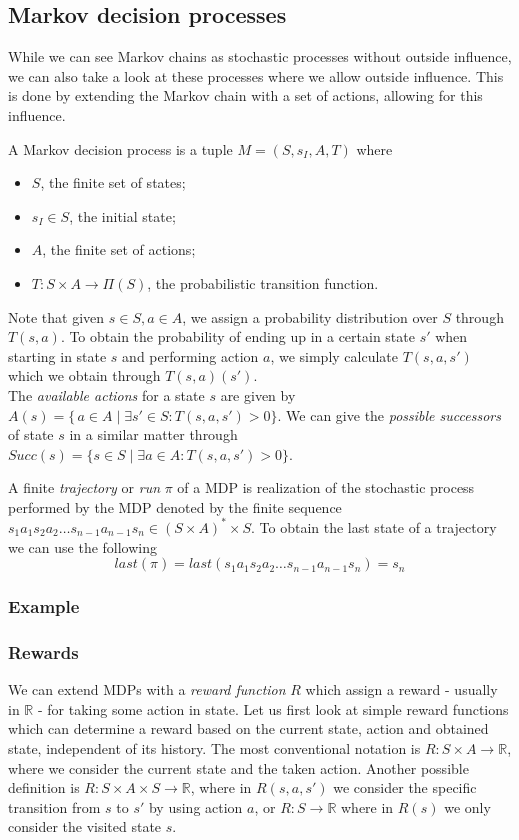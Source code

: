 \subsection{Markov decision processes}
While we can see Markov chains as stochastic processes without outside influence, we can also take a look at these processes where we allow outside influence. This is done by extending the Markov chain with a set of actions, allowing for this influence. 
\begin{definition}[MDP]
	A Markov decision process is a tuple $M=(S,s_I,A,T)$ where 
	\begin{itemize}
		\item $S$, the finite set of states;
		\item $s_I\in S$, the initial state;
		\item $A$, the finite set of actions;
		\item $T:S\times A\to \Pi(S)$, the probabilistic transition function.
	\end{itemize}
\end{definition}

Note that given $s\in S,a\in A$, we assign a probability distribution over $S$ through $T(s,a)$. To obtain the probability of ending up in a certain state $s'$ when starting in state $s$ and performing action $a$, we simply calculate $T(s,a,s')$ which we obtain through $T(s,a)(s')$.\\

The \textit{available actions} for a state $s$ are given by $A(s)=\{\,a\in A\mid \exists s'\in S: T(s,a,s')>0\}$. We can give the \textit{possible successors} of state $s$ in a similar matter through $Succ(s)=\{s\in S\mid\exists a\in A : T(s,a,s')>0\}$.

A finite \textit{trajectory} or \textit{run} $\pi$ of a MDP is realization of the stochastic process performed by the MDP denoted by the finite sequence $s_1 a_1 s_2 a_2\dots s_{n-1} a_{n-1} s_n \in (S\times A)^*\times S$. To obtain the last state of a trajectory we can use the following \[last(\pi)=last(s_1 a_1 s_2 a_2\dots s_{n-1} a_{n-1} s_n)=s_n\]

\subsubsection*{Example}

\subsubsection*{Rewards}
We can extend MDPs with a \textit{reward function} $R$ which assign a reward - usually in $\mathbb{R}$ - for taking some action in state. Let us first look at simple reward functions which can determine a reward based on the current state, action and obtained state, independent of its history. The most conventional notation is $R:S\times A\to \mathbb{R}$, where we consider the current state and the taken action. Another possible definition is $R:S\times A\times S\to\mathbb{R}$, where  in $R(s,a,s')$ we consider the specific transition from $s$ to $s'$ by using action $a$, or $R:S\to\mathbb{R}$ where in $R(s)$ we only consider the visited state $s$. 

